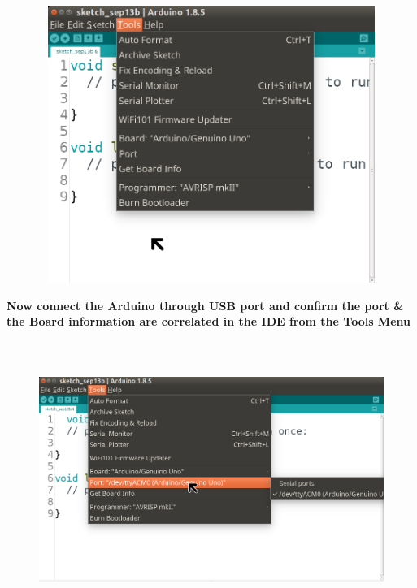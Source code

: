 \documentclass[12pt,a4paper]{article}
\begin{document}
\begin{figure}[h!]
    \centering
	\includegraphics[width=15cm, height=9cm]{Introduction/6.png}
\end{figure}
\clearpage
\textbf{Now connect the Arduino through USB port and confirm the port \& the Board information are correlated in the IDE from the Tools Menu}\\
\begin{figure}[h!]
    \centering
	\includegraphics[width=15cm, height=9cm]{Introduction/7.png}
\end{figure}
\end{document}
